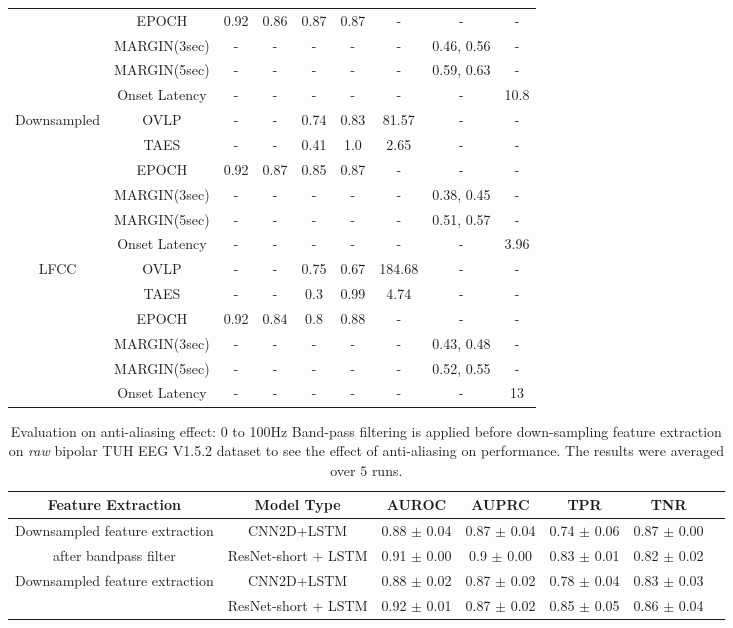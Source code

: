\documentclass[pmlr,twocolumn,10pt]{jmlr}
\begin{document}
\begin{table*}[ht!]
\begin{tabular}{c|c|ccccccc}
		& EPOCH & 0.92 & 0.86 & 0.87 & 0.87 & - & - & - \\
		& MARGIN(3sec)  & - & - & - & - & - & 0.46, 0.56 & - \\
		& MARGIN(5sec) & - & - & - & - & - & 0.59, 0.63 & - \\
		& Onset Latency & - & - & - & - & - & - & 10.8 \\
		\midrule
		\multirow{6}{*}{Downsampled} 
		& OVLP & - & - & 0.74 & 0.83 & 81.57 & - & - \\
		& TAES & - & - & 0.41 & 1.0 & 2.65 & - & - \\
		& EPOCH & 0.92 & 0.87 & 0.85 & 0.87 & - & - & - \\
		& MARGIN(3sec)  & - & - & - & - & - & 0.38, 0.45 & - \\
		& MARGIN(5sec) & - & - & - & - & - & 0.51, 0.57 & - \\
		& Onset Latency & - & - & - & - & - & - & 3.96 \\
		\midrule
		\multirow{6}{*}{LFCC} 
		& OVLP & - & - & 0.75 & 0.67 & 184.68 & - & - \\
		& TAES & - & - & 0.3 & 0.99 & 4.74 & - & - \\
		& EPOCH & 0.92 & 0.84 & 0.8 & 0.88 & - & - & - \\
		& MARGIN(3sec)  & - & - & - & - & - & 0.43, 0.48 & - \\
		& MARGIN(5sec) & - & - & - & - & - & 0.52, 0.55 & - \\
		& Onset Latency & - & - & - & - & - & - & 13 \\
		\bottomrule
	\end{tabular}
\end{table*}
 \begin{table*}[ht!]
	\small
	\centering
	\caption{Evaluation on anti-aliasing effect: 0 to 100Hz Band-pass filtering is applied before down-sampling feature extraction on \textit{raw} bipolar TUH EEG V1.5.2 dataset to see the effect of anti-aliasing on performance. The results were averaged over $5$ runs.}
	\label{antialiasing}
	\begin{tabular}{c|c|ccccc}
		\toprule
		Feature Extraction & Model Type & AUROC & AUPRC & TPR & TNR\\
		\midrule
		Downsampled feature extraction
		&CNN2D+LSTM 
		& 0.88 $\pm$ 0.04
		& 0.87 $\pm$ 0.04
		& 0.74 $\pm$ 0.06 
		& 0.87 $\pm$ 0.00
		\\
		after bandpass filter &ResNet-short + LSTM
		& 0.91 $\pm$ 0.00 
		& 0.9 $\pm$ 0.00
		& 0.83 $\pm$ 0.01 
		& 0.82 $\pm$ 0.02 \\
	
		\midrule
		\multirow{2}{*}{Downsampled feature extraction}
		&CNN2D+LSTM 
		& 0.88 $\pm$ 0.02
		& 0.87 $\pm$ 0.02
		& 0.78 $\pm$ 0.04
		& 0.83 $\pm$ 0.03
		\\
		&ResNet-short + LSTM
		& 0.92 $\pm$ 0.01 
		& 0.87 $\pm$ 0.02 
		& 0.85 $\pm$ 0.05 
		& 0.86 $\pm$ 0.04
		\\


		\bottomrule
	\end{tabular}
\end{table*}  
\end{document}
